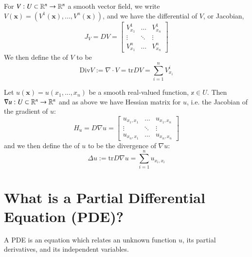 \documentclass[12pt, a4paper, oneside, openright, titlepage]{book}
\begin{document}
\begin{defn}
    For $V:U\subset \mathbb R^n\rightarrow \mathbb R^n$ a smooth vector field, we write $V(\mathbf{x}) = (V^1(\mathbf{x}),...,V^n(\mathbf{x}))$, and we have the differential of $V$, or Jacobian, \begin{equation*}
        J_V = DV = \begin{bmatrix} V_{x_1}^1 & \hdots & V_{x_n}^1 \\ \vdots & \ddots & \vdots \\ V_{x_1}^n & \hdots & V_{x_n}^n \end{bmatrix}
    \end{equation*}
    We then define the  of $V$ to be \begin{equation*}
        \text{Div}V:= \nabla\cdot V = \text{tr}DV = \sum_{i=1}^nV^i_{x_i} 
    \end{equation*}
\end{defn}

\begin{defn}
    Let $u(\mathbf{x}) = u(x_1,...,x_n)$ be a smooth real-valued function, $\mathbb{x} \in U$. Then $\nabla u:U\subset \mathbb R^n\rightarrow \mathbb R^n$ and as above we have Hessian matrix for $u$, i.e. the Jacobian of the gradient of $u$: \begin{equation*}
        H_u = D\nabla u = \begin{bmatrix} u_{x_1,x_1} & \hdots & u_{x_1,x_n} \\ \vdots & \ddots & \vdots \\ u_{x_n,x_1} & \hdots & u_{x_n,x_n} \end{bmatrix}
    \end{equation*}
    and we then define the  of $u$ to be the divergence of $\nabla u$: \begin{equation*}
        \Delta u:= \text{tr}D\nabla u = \sum_{i=1}^nu_{x_i,x_i} 
    \end{equation*}
\end{defn}



\section{What is a Partial Differential Equation (PDE)?}

\begin{defn}
    A PDE is an equation which relates an unknown function $u$, its partial derivatives, and its independent variables. 
\end{defn}
\end{document}
